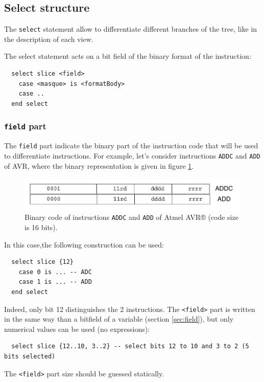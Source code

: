 \subsection{Select structure}
\label{sec:formatSelect}
The \texttt{select} statement allow to differentiate different branches of the tree, like in the description of each view.

The select statement acts on a bit field of the binary format of the instruction:
\begin{lstlisting}
  select slice <field>
    case <masque> is <formatBody>
    case .. 
  end select
\end{lstlisting}

\subsubsection{\texttt{field} part}
The \texttt{field} part indicate the binary part of the instruction code that will be used to differentiate instructions. For example, let's consider instructions \texttt{ADDC} and \texttt{ADD} of AVR, where the binary representation is given in figure \ref{fig:selectFormat1}.

\begin{figure}[h]		%
  \begin{center}
    \includegraphics[width=0.8 \linewidth]{../common/images/selectFormat1.pdf}
    \caption{Binary code of instructions \texttt{ADDC} and \texttt{ADD} of Atmel AVR® (code size is 16 bits).}
    \label{fig:selectFormat1}
  \end{center}
\end{figure}

In this case,the following construction can be used:
\begin{lstlisting}
  select slice {12}
    case 0 is ... -- ADC
    case 1 is ... -- ADD
  end select
\end{lstlisting}

Indeed, only bit 12 distinguishes the 2 instructions. The \texttt{<field>} part is written in the same way than a bitfield of a variable (section \ref{sec:field}), but only numerical values can be used (no expressions):
\begin{lstlisting}
  select slice {12..10, 3..2} -- select bits 12 to 10 and 3 to 2 (5 bits selected)
\end{lstlisting}
The  \texttt{<field>} part size should be guessed statically.

